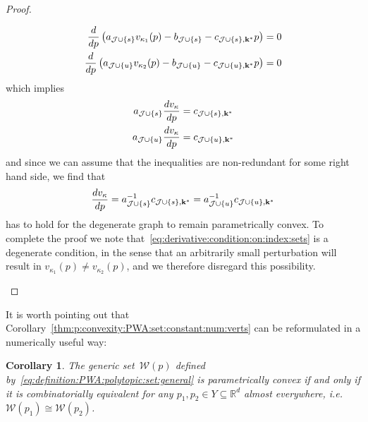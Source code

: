 \documentclass[final]{elsarticle}
\newcounter{thmcount}
\newtheorem{cor}[thmcount]{Corollary}
\theoremstyle{remark}
\theoremstyle{definition}
\begin{document}
\begin{proof}
\begin{enumerate}
\begin{align*}
  \frac{d}{dp}\left(  a_{\mathcal J\cup \{s\}} v_{\kappa_1}(p) - b_{\mathcal J\cup \{s\}} - 
  c_{\mathcal J\cup \{s\},{\bf{k}}^\ast} p\right) &= 0\\
  \frac{d}{dp}\left(  a_{\mathcal J\cup \{u\}} v_{\kappa_2}(p) - b_{\mathcal J\cup \{u\}} - 
  c_{\mathcal J\cup \{u\},{\bf{k}}^\ast} p\right) &= 0
\end{align*}
%
which implies
\begin{align*}
  a_{\mathcal J\cup \{s\}} \frac{dv_{\kappa}}{dp} &= c_{\mathcal J\cup \{s\},{\bf{k}}^\ast}\\
  a_{\mathcal J\cup \{u\}} \frac{dv_{\kappa}}{dp} &= c_{\mathcal J\cup \{u\},{\bf{k}}^\ast}
\end{align*}
%
and since we can assume that the inequalities are non-redundant for some right hand side, we find that 
%
\begin{equation}\label{eq:derivative:condition:on:index:sets}
  \frac{dv_\kappa}{dp} = a_{\mathcal J\cup \{s\}}^{-1}c_{\mathcal J\cup \{s\},{\bf{k}}^\ast} = 
  a_{\mathcal J\cup \{u\}}^{-1}c_{\mathcal J\cup \{u\},{\bf{k}}^\ast}
\end{equation}
%
has to hold for the degenerate graph to remain parametrically convex.
%
To complete the proof we note that~\eqref{eq:derivative:condition:on:index:sets} is a degenerate condition, in the sense that an arbitrarily small perturbation will result in $v_{\kappa_1}(p) \neq v_{\kappa_2}(p)$, and we therefore disregard this possibility.
\end{enumerate}
\baselineskip
\end{proof}
%
It is worth pointing out that Corollary~\ref{thm:p:convexity:PWA:set:constant:num:verts} can be reformulated in a numerically useful way:
%
\begin{cor}\label{thm:combinatorical:equivalence:alternative}
The generic set~$\mathcal W(p)$ defined by~\eqref{eq:definition:PWA:polytopic:set:general} is parametrically convex if and only if it is combinatorially equivalent for any $p_1,p_2\in Y\subseteq\mathbb R^d$ almost everywhere, i.e.\ $\mathcal W(p_1)\cong\mathcal W(p_2)$.
\end{cor}
%
\end{document}
